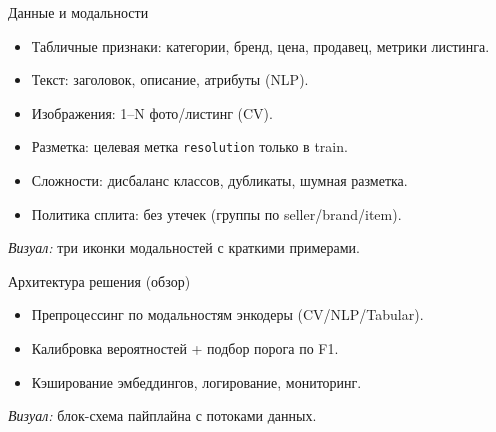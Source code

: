 \documentclass[aspectratio=169,10pt]{beamer}
\newcommand{\cv}[1]{\textcolor{CVColor}{#1}}
\newcommand{\nlp}[1]{\textcolor{NLPColor}{#1}}
\newcommand{\tabmod}[1]{\textcolor{TABColor}{#1}}
\begin{document}
\begin{frame}{Данные и модальности}
\begin{itemize}
  \item Табличные признаки: категории, бренд, цена, продавец, метрики листинга.
  \item Текст: заголовок, описание, атрибуты (\nlp{NLP}).
  \item Изображения: 1–N фото/листинг (\cv{CV}).
  \item Разметка: целевая метка \texttt{resolution} только в train.
  \item Сложности: дисбаланс классов, дубликаты, шумная разметка.
  \item Политика сплита: без утечек (группы по seller/brand/item).
\end{itemize}
\medskip
\textit{Визуал:} три иконки модальностей с краткими примерами.
\end{frame}

\begin{frame}{Архитектура решения (обзор)}
\begin{itemize}
  \item Препроцессинг по модальностям \textrightarrow{} энкодеры (\cv{CV}/\nlp{NLP}/\tabmod{Tabular}).
  \item Калибровка вероятностей + подбор порога по F1.
  \item Кэширование эмбеддингов, логирование, мониторинг.
\end{itemize}
\medskip
\textit{Визуал:} блок-схема пайплайна с потоками данных.
\end{frame}
\end{document}
